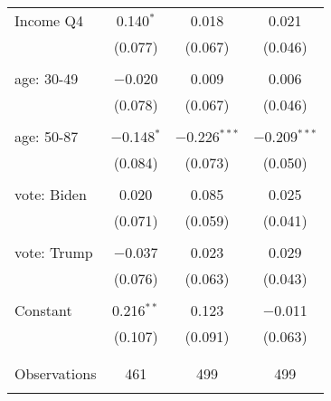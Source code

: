 \begin{tabular}{@{\extracolsep{5pt}}lccc}
 Income Q4 & 0.140$^{*}$ & 0.018 & 0.021 \\ 
  & (0.077) & (0.067) & (0.046) \\ 
  & & & \\ 
 age: 30-49 & $-$0.020 & 0.009 & 0.006 \\ 
  & (0.078) & (0.067) & (0.046) \\ 
  & & & \\ 
 age: 50-87 & $-$0.148$^{*}$ & $-$0.226$^{***}$ & $-$0.209$^{***}$ \\ 
  & (0.084) & (0.073) & (0.050) \\ 
  & & & \\ 
 vote: Biden & 0.020 & 0.085 & 0.025 \\ 
  & (0.071) & (0.059) & (0.041) \\ 
  & & & \\ 
 vote: Trump & $-$0.037 & 0.023 & 0.029 \\ 
  & (0.076) & (0.063) & (0.043) \\ 
  & & & \\ 
 Constant & 0.216$^{**}$ & 0.123 & $-$0.011 \\ 
  & (0.107) & (0.091) & (0.063) \\ 
  & & & \\ 
\hline \\[-1.8ex] 

Observations & 461 & 499 & 499 \\ 
\hline 
\hline \\[-1.8ex] 
\end{tabular} 